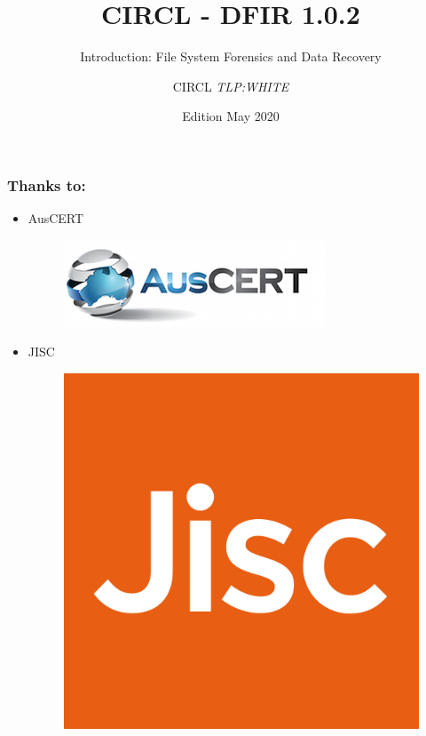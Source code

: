 \documentclass{beamer}
\author{CIRCL \emph{TLP:WHITE}}
\title{CIRCL - DFIR 1.0.2}
\subtitle{Introduction: File System Forensics and Data Recovery}
\institute{info@circl.lu}
\date{Edition May 2020}
\begin{document}
\begin{frame}[t,plain]
\titlepage
\end{frame}

\begin{frame}
  \frametitle{Thanks to:}
  \begin{itemize}
  \item[] AusCERT
    \begin{figure}
        \includegraphics[scale=0.3, angle=0, trim=0 0 0 0]{images/auscert_logo.png}
    \end{figure}
  \item[] JISC
    \begin{figure}
        \includegraphics[scale=0.06, angle=0, trim=0 0 0 0]{images/jisc-logo.png}
    \end{figure}
  \end{itemize}
\end{frame}
\end{document}
